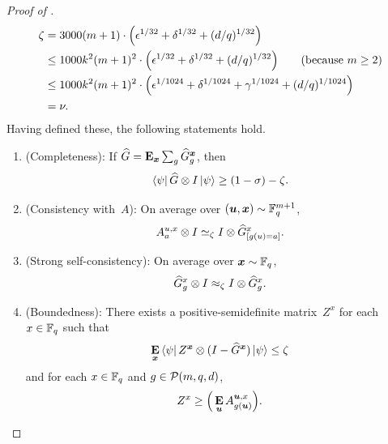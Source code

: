 \begin{proof}[Proof of ]
\begin{align}
\zeta & = 3000 (m+1) \cdot \Big(\epsilon^{1/32} + \delta^{1/32} + (d/q)^{1/32}\Big)\nonumber\\
& \leq 1000 k^2 (m+1)^2\cdot \Big(\epsilon^{1/32} + \delta^{1/32} + (d/q)^{1/32}\Big) \tag{because $m \geq 2$}\nonumber\\
&\leq 1000k^2 (m+1)^2 \cdot\Big(\epsilon^{1/1024} + \delta^{1/1024} + \gamma^{1/1024} + (d/q)^{1/1024}\Big)\nonumber\\
& = \nu. \label{eq:zeta-smaller-than-nu}
\end{align}
Having defined these, the following statements hold.
\begin{enumerate}
    \item(Completeness): If $\widehat{G} =  \mathop{\bf E\/}_{{\boldsymbol{x}}} \sum_g \widehat{G}^{{\boldsymbol{x}}}_g$, then
    \begin{equation*}
    \bra{\psi} \widehat{G} \otimes I \ket{\psi} \geq (1-\sigma) - \zeta.
    \end{equation*}
    \item(Consistency with~$A$): On average over $(\boldsymbol{u},{\boldsymbol{x}}) \sim \mathbb F_q^{m+1}$,
        \begin{equation*}
            A^{u,x}_a \otimes I \simeq_{\zeta} I \otimes \widehat{G}^x_{[g(u) = a]}.
        \end{equation*}
    \item(Strong self-consistency): On average over ${\boldsymbol{x}} \sim \mathbb F_q$,
    	\begin{equation*}
		\widehat{G}^x_g \otimes I \approx_{\zeta} I \otimes \widehat{G}^x_g.
	\end{equation*}
    \item(Boundedness): There exists a positive-semidefinite matrix~$Z^x$ for each $x \in \mathbb F_q$ such that
    \begin{equation*}
        \mathop{\bf E\/}_{{\boldsymbol{x}}} \bra{\psi} Z^{{\boldsymbol{x}}} \otimes (I - \widehat{G}^{{\boldsymbol{x}}}) \ket{\psi} \leq \zeta
    \end{equation*}
    and for each $x \in\mathbb F_q$ and $g \in \mathcal{P}(m, q, d)$,
	\begin{equation*}
	Z^x \geq \Big( \mathop{\bf E\/}_{\boldsymbol{u}} A^{\boldsymbol{u},x}_{g(\boldsymbol{u})}\Big).
	\end{equation*}
\end{enumerate}


\end{proof}
